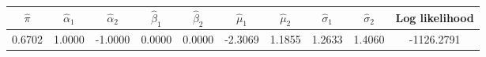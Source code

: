 \begin{tabular}{c |c |c |c |c |c |c |c |c |c}
$\hat\pi$ & $\hat\alpha_1$ & $\hat\alpha_2$ & $\hat\beta_1$ & $\hat\beta_2$ & $\hat\mu_1$ & $\hat\mu_2$ & $\hat\sigma_1$ & $\hat\sigma_2$ & Log likelihood \\
    \hline
  0.6702 & 1.0000 & -1.0000 & 0.0000 & 0.0000 & -2.3069 & 1.1855 & 1.2633 & 1.4060 & -1126.2791 \\
\end{tabular}
